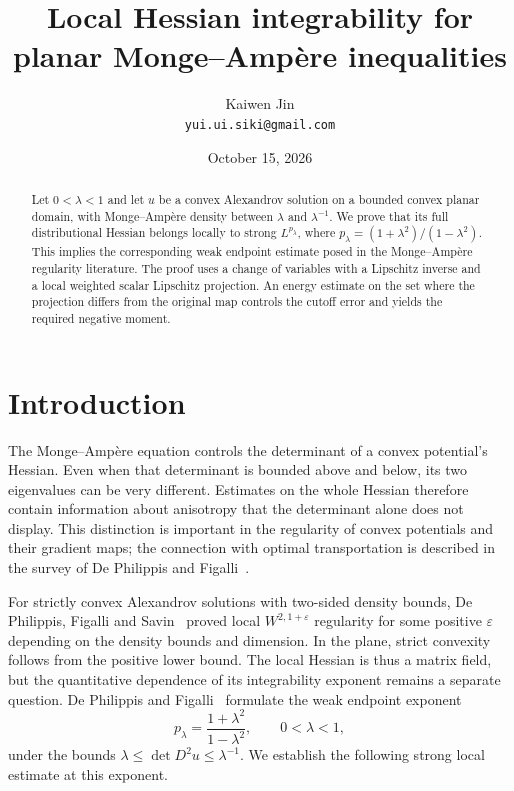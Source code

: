 \documentclass[11pt]{article}
\title{Local Hessian integrability for planar Monge--Amp\`ere inequalities}
\author{Kaiwen Jin\\[2pt]\small\texttt{yui.ui.siki@gmail.com}}
\date{October 15, 2026}
\theoremstyle{remark}
\numberwithin{equation}{section}
\begin{document}
\maketitle

\begin{abstract}
Let \(0<\lambda<1\) and let \(u\) be a convex Alexandrov solution on a bounded
convex planar domain, with Monge--Amp\`ere density between \(\lambda\) and
\(\lambda^{-1}\). We prove that its full distributional Hessian belongs locally
to strong \(L^{p_\lambda}\), where
\(p_\lambda=(1+\lambda^2)/(1-\lambda^2)\). This implies the corresponding weak
endpoint estimate posed in the Monge--Amp\`ere regularity literature.
The proof uses a change of variables with a Lipschitz inverse and a local
weighted scalar Lipschitz projection. An energy estimate on the set where
the projection differs from the original map controls the cutoff error
and yields the required negative moment.
\end{abstract}

\section{Introduction}\label{sec:intro}

The Monge--Amp\`ere equation controls the determinant of a convex potential's
Hessian. Even when that determinant is bounded above and below, its two
eigenvalues can be very different. Estimates on the whole Hessian therefore
contain information about anisotropy that the determinant alone does not
display. This distinction is important in the regularity of convex potentials
and their gradient maps; the connection with optimal transportation is
described in the survey of De Philippis and Figalli~\cite{DPF}.

For strictly convex Alexandrov solutions with two-sided density bounds,
De Philippis, Figalli and Savin~\cite[Theorem~1.1]{DFS} proved local
\(W^{2,1+\varepsilon}\) regularity for some positive \(\varepsilon\) depending
on the density bounds and dimension. In the plane, strict convexity follows
from the positive lower bound. The local Hessian is thus a matrix field, but
the quantitative dependence of its integrability exponent remains a separate
question. De Philippis and Figalli~\cite[\S5.2(2)]{DPF} formulate the weak
endpoint exponent
\[
p_\lambda=\frac{1+\lambda^2}{1-\lambda^2},
\qquad 0<\lambda<1,
\]
under the bounds \(\lambda\le\det D^2u\le\lambda^{-1}\).
We establish the following strong local estimate at this exponent.
\end{document}
